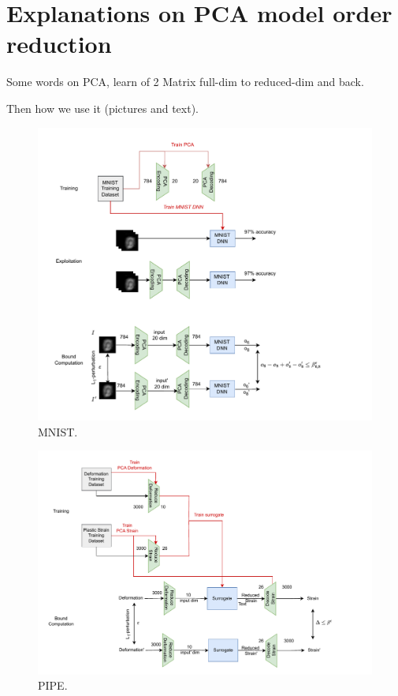 \section{Explanations on PCA model order reduction}

Some words on PCA, learn of 2 Matrix full-dim to reduced-dim and back.






Then how we use it (pictures and text).

\begin{figure}[]
	\centering
	\includegraphics[scale=0.9]{MNIST.pdf} \hspace{1.5cm}
	\caption{MNIST.}
	\label{fig.MNIST}
\end{figure}	

\begin{figure}[]
	\centering
	\includegraphics[scale=0.9]{PIPE.pdf} \hspace{1.5cm}
	\caption{PIPE.}
	\label{fig.PIPE}
\end{figure}	

